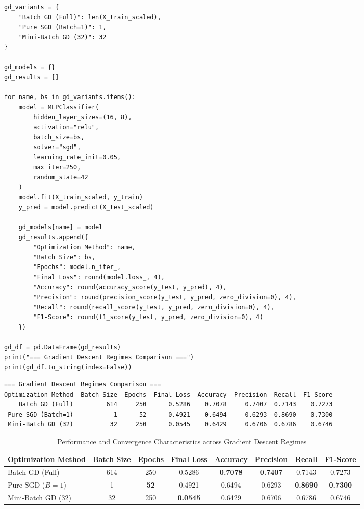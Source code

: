 \documentclass[12pt]{article}
\begin{document}
\begin{lstlisting}[style=code, caption={Gradient Descent Optimization Regimes Implementation}]
gd_variants = {
    "Batch GD (Full)": len(X_train_scaled),
    "Pure SGD (Batch=1)": 1,
    "Mini-Batch GD (32)": 32
}

gd_models = {}
gd_results = []

for name, bs in gd_variants.items():
    model = MLPClassifier(
        hidden_layer_sizes=(16, 8),
        activation="relu",
        batch_size=bs,
        solver="sgd",
        learning_rate_init=0.05,
        max_iter=250,
        random_state=42
    )
    model.fit(X_train_scaled, y_train)
    y_pred = model.predict(X_test_scaled)
    
    gd_models[name] = model
    gd_results.append({
        "Optimization Method": name,
        "Batch Size": bs,
        "Epochs": model.n_iter_,
        "Final Loss": round(model.loss_, 4),
        "Accuracy": round(accuracy_score(y_test, y_pred), 4),
        "Precision": round(precision_score(y_test, y_pred, zero_division=0), 4),
        "Recall": round(recall_score(y_test, y_pred, zero_division=0), 4),
        "F1-Score": round(f1_score(y_test, y_pred, zero_division=0), 4)
    })

gd_df = pd.DataFrame(gd_results)
print("=== Gradient Descent Regimes Comparison ===")
print(gd_df.to_string(index=False))
\end{lstlisting}

\begin{lstlisting}[style=output, caption={Gradient Descent Regimes Execution Output}]
=== Gradient Descent Regimes Comparison ===
Optimization Method  Batch Size  Epochs  Final Loss  Accuracy  Precision  Recall  F1-Score
    Batch GD (Full)         614     250      0.5286    0.7078     0.7407  0.7143    0.7273
 Pure SGD (Batch=1)           1      52      0.4921    0.6494     0.6293  0.8690    0.7300
 Mini-Batch GD (32)          32     250      0.0545    0.6429     0.6706  0.6786    0.6746
\end{lstlisting}

\begin{table}[H]
\centering
\caption{Performance and Convergence Characteristics across Gradient Descent Regimes}
\vspace{0.2cm}
\begin{tabular}{lccccccc}
\toprule
\textbf{Optimization Method} & \textbf{Batch Size} & \textbf{Epochs} & \textbf{Final Loss} & \textbf{Accuracy} & \textbf{Precision} & \textbf{Recall} & \textbf{F1-Score} \\
\midrule
Batch GD (Full)    & 614 & 250 & 0.5286 & \textbf{0.7078} & \textbf{0.7407} & 0.7143 & 0.7273 \\
Pure SGD ($B=1$)   & 1   & \textbf{52}  & 0.4921 & 0.6494 & 0.6293 & \textbf{0.8690} & \textbf{0.7300} \\
Mini-Batch GD (32) & 32  & 250 & \textbf{0.0545} & 0.6429 & 0.6706 & 0.6786 & 0.6746 \\
\bottomrule
\end{tabular}
\end{table}
\end{document}

